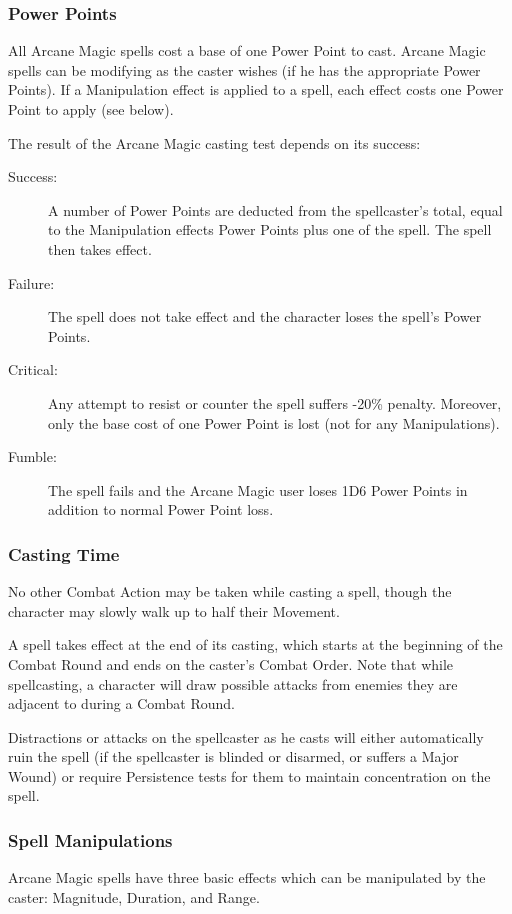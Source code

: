 \subsubsection{Power Points}
All Arcane Magic spells cost a base of one Power Point to cast. Arcane Magic spells can be modifying as the caster wishes (if he has the appropriate Power Points). If a Manipulation effect is applied to a spell, each effect costs one Power Point to apply (see below). 

The result of the Arcane Magic casting test depends on its success:
\begin{description}
	\item[Success:] A number of Power Points are deducted from the spellcaster’s total, equal to the Manipulation effects Power Points plus one of the spell. The spell then takes effect.
	\item[Failure:] The spell does not take effect and the character loses the spell's Power Points.
	\item[Critical:] Any attempt to resist or counter the spell suffers -20\% penalty. Moreover, only the base cost of one Power Point is lost (not for any Manipulations).
	\item[Fumble:] The spell fails and the Arcane Magic user loses 1D6 Power Points in addition to normal Power Point loss.
\end{description}


\subsubsection{Casting Time}
No other Combat Action may be taken while casting a spell, though the character may slowly walk up to half their Movement. 

A spell takes effect at the end of its casting, which starts at the beginning of the Combat Round and ends on the caster's Combat Order. Note that while spellcasting, a character will draw possible attacks from enemies they are adjacent to during a Combat Round. 

Distractions or attacks on the spellcaster as he casts will either automatically ruin the spell (if the spellcaster is blinded or disarmed, or suffers a Major Wound) or require Persistence tests for them to maintain concentration on the spell. 

\subsubsection{Spell Manipulations}
Arcane Magic spells have three basic effects which can be manipulated by the caster: Magnitude, Duration, and Range.

